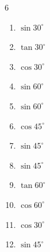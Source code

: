 \begin{multicols}{6}
\begin{enumerate}
  \item $\displaystyle \sin{30^\circ}$


  \item $\displaystyle \tan{30^\circ}$


  \item $\displaystyle \cos{30^\circ}$


  \item $\displaystyle \sin{60^\circ}$


  \item $\displaystyle \sin{60^\circ}$


  \item $\displaystyle \cos{45^\circ}$


  \item $\displaystyle \sin{45^\circ}$


  \item $\displaystyle \sin{45^\circ}$


\columnbreak %

  \item $\displaystyle \tan{60^\circ}$


  \item $\displaystyle \cos{60^\circ}$


  \item $\displaystyle \cos{30^\circ}$


  \item $\displaystyle \sin{45^\circ}$



\end{enumerate}
\end{multicols}
